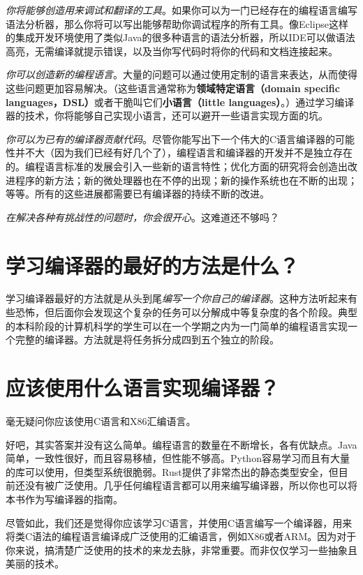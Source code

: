 \documentclass[cn,11pt,chinese]{elegantbook}
\begin{document}
\textit{你将能够创造用来调试和翻译的工具}。如果你可以为一门已经存在的编程语言编写语法分析器，那么你将可以写出能够帮助你调试程序的所有工具。像Eclipse这样的集成开发环境使用了类似Java的很多种语言的语法分析器，所以IDE可以做语法高亮，无需编译就提示错误，以及当你写代码时将你的代码和文档连接起来。

\textit{你可以创造新的编程语言}。大量的问题可以通过使用定制的语言来表达，从而使得这些问题更加容易解决。（这些语言通常称为\textbf{领域特定语言（domain specific languages，DSL）}或者干脆叫它们\textbf{小语言（little languages）}。）通过学习编译器的技术，你将能够自己实现小语言，还可以避开一些语言实现方面的坑。

\textit{你可以为已有的编译器贡献代码}。尽管你能写出下一个伟大的C语言编译器的可能性并不大（因为我们已经有好几个了），编程语言和编译器的开发并不是独立存在的。编程语言标准的发展会引入一些新的语言特性；优化方面的研究将会创造出改进程序的新方法；新的微处理器也在不停的出现；新的操作系统也在不断的出现；等等。所有的这些进展都需要已有编译器的持续不断的改进。

\textit{在解决各种有挑战性的问题时，你会很开心}。这难道还不够吗？

\section{学习编译器的最好的方法是什么？}

学习编译器最好的方法就是从头到尾\textit{编写一个你自己的编译器}。这种方法听起来有些恐怖，但后面你会发现这个复杂的任务可以分解成中等复杂度的各个阶段。典型的本科阶段的计算机科学的学生可以在一个学期之内为一门简单的编程语言实现一个完整的编译器。方法就是将任务拆分成四到五个独立的阶段。

\section{应该使用什么语言实现编译器？}

毫无疑问你应该使用C语言和X86汇编语言。

好吧，其实答案并没有这么简单。编程语言的数量在不断增长，各有优缺点。Java简单，一致性很好，而且容易移植，但性能不够高。Python容易学习而且有大量的库可以使用，但类型系统很脆弱。Rust提供了非常杰出的静态类型安全，但目前还没有被广泛使用。几乎任何编程语言都可以用来编写编译器，所以你也可以将本书作为写编译器的指南。

尽管如此，我们还是觉得你应该学习C语言，并使用C语言编写一个编译器，用来将类C语法的编程语言编译成广泛使用的汇编语言，例如X86或者ARM。因为对于你来说，搞清楚广泛使用的技术的来龙去脉，非常重要。而非仅仅学习一些抽象且美丽的技术。
\end{document}
